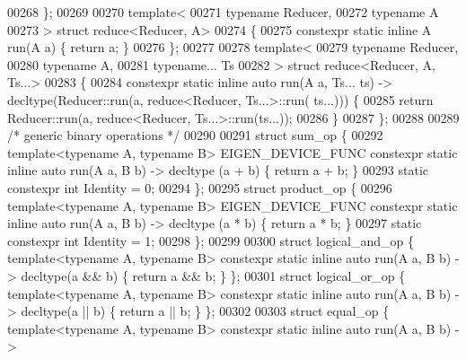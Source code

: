 \begin{DoxyCode}
00268 \};
00269 
00270 \textcolor{keyword}{template}<
00271   \textcolor{keyword}{typename} Reducer,
00272   \textcolor{keyword}{typename} A
00273 > \textcolor{keyword}{struct }reduce<Reducer, A>
00274 \{
00275   constexpr \textcolor{keyword}{static} \textcolor{keyword}{inline} A run(A a) \{ \textcolor{keywordflow}{return} a; \}
00276 \};
00277 
00278 \textcolor{keyword}{template}<
00279   \textcolor{keyword}{typename} Reducer,
00280   \textcolor{keyword}{typename} A,
00281   \textcolor{keyword}{typename}... Ts
00282 > \textcolor{keyword}{struct }reduce<Reducer, A, Ts...>
00283 \{
00284   constexpr \textcolor{keyword}{static} \textcolor{keyword}{inline} \textcolor{keyword}{auto} run(A a, Ts... ts) -> decltype(Reducer::run(a, reduce<Reducer, Ts...>::run(
      ts...))) \{
00285     \textcolor{keywordflow}{return} Reducer::run(a, reduce<Reducer, Ts...>::run(ts...));
00286   \}
00287 \};
00288 
00289 \textcolor{comment}{/* generic binary operations */}
00290 
00291 \textcolor{keyword}{struct }sum\_op           \{
00292   \textcolor{keyword}{template}<\textcolor{keyword}{typename} A, \textcolor{keyword}{typename} B> EIGEN\_DEVICE\_FUNC constexpr \textcolor{keyword}{static} \textcolor{keyword}{inline} \textcolor{keyword}{auto} run(A a, B b) -> decltype
      (a + b)   \{ \textcolor{keywordflow}{return} a + b;   \}
00293   \textcolor{keyword}{static} constexpr \textcolor{keywordtype}{int} Identity = 0;
00294 \};
00295 \textcolor{keyword}{struct }product\_op       \{
00296   \textcolor{keyword}{template}<\textcolor{keyword}{typename} A, \textcolor{keyword}{typename} B> EIGEN\_DEVICE\_FUNC constexpr \textcolor{keyword}{static} \textcolor{keyword}{inline} \textcolor{keyword}{auto} run(A a, B b) -> decltype
      (a * b)   \{ \textcolor{keywordflow}{return} a * b;   \}
00297   \textcolor{keyword}{static} constexpr \textcolor{keywordtype}{int} Identity = 1;
00298 \};
00299 
00300 \textcolor{keyword}{struct }logical\_and\_op   \{ \textcolor{keyword}{template}<\textcolor{keyword}{typename} A, \textcolor{keyword}{typename} B> constexpr \textcolor{keyword}{static} \textcolor{keyword}{inline} \textcolor{keyword}{auto} run(A a, B b) -> 
      decltype(a && b)  \{ \textcolor{keywordflow}{return} a && b;  \} \};
00301 \textcolor{keyword}{struct }logical\_or\_op    \{ \textcolor{keyword}{template}<\textcolor{keyword}{typename} A, \textcolor{keyword}{typename} B> constexpr \textcolor{keyword}{static} \textcolor{keyword}{inline} \textcolor{keyword}{auto} run(A a, B b) -> 
      decltype(a || b)  \{ \textcolor{keywordflow}{return} a || b;  \} \};
00302 
00303 \textcolor{keyword}{struct }equal\_op         \{ \textcolor{keyword}{template}<\textcolor{keyword}{typename} A, \textcolor{keyword}{typename} B> constexpr \textcolor{keyword}{static} \textcolor{keyword}{inline} \textcolor{keyword}{auto} run(A a, B b) -> 

\end{DoxyCode}
